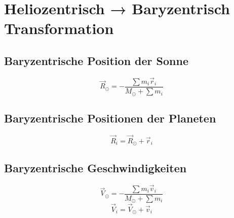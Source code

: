 \section{Heliozentrisch → Baryzentrisch Transformation}
\subsection{Baryzentrische Position der Sonne}
\[
\vec{R}_\odot = -\frac{\sum m_i \vec{r}_i}{M_\odot + \sum m_i}
\]

\subsection{Baryzentrische Positionen der Planeten}
\[
\vec{R}_i = \vec{R}_\odot + \vec{r}_i
\]

\subsection{Baryzentrische Geschwindigkeiten}
\[
\vec{V}_\odot = -\frac{\sum m_i \vec{v}_i}{M_\odot + \sum m_i}
\]
\[
\vec{V}_i = \vec{V}_\odot + \vec{v}_i
\]